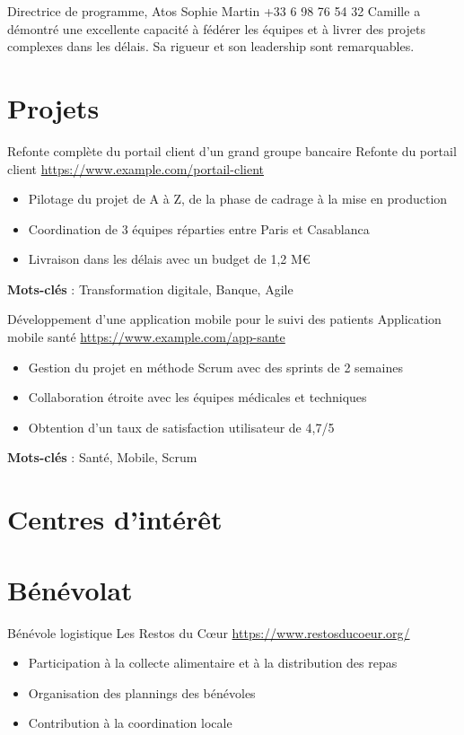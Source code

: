 \documentclass[a4paper, serif, 10pt]{moderncv}
\begin{document}
        {Directrice de programme, Atos}
        {Sophie Martin}
        {+33 6 98 76 54 32}
        {}
        {Camille a démontré une excellente capacité à fédérer les équipes et à livrer des projets complexes dans les délais. Sa rigueur et son leadership sont remarquables.}
\section{Projets}

        {Refonte complète du portail client d'un grand groupe bancaire}
        {Refonte du portail client}
        {\url{https://www.example.com/portail-client}}
        {}
        {\begin{itemize}
\item Pilotage du projet de A à Z, de la phase de cadrage à la mise en production
\item Coordination de 3 équipes réparties entre Paris et Casablanca
\item Livraison dans les délais avec un budget de 1,2 M€
\end{itemize}
\textbf{Mots-clés} : Transformation digitale, Banque, Agile}

        {Développement d'une application mobile pour le suivi des patients}
        {Application mobile santé}
        {\url{https://www.example.com/app-sante}}
        {}
        {\begin{itemize}
\item Gestion du projet en méthode Scrum avec des sprints de 2 semaines
\item Collaboration étroite avec les équipes médicales et techniques
\item Obtention d'un taux de satisfaction utilisateur de 4,7/5
\end{itemize}
\textbf{Mots-clés} : Santé, Mobile, Scrum}
\section{Centres d'intérêt}

\section{Bénévolat}

        {Bénévole logistique}
        {Les Restos du Cœur}
        {\url{https://www.restosducoeur.org/}}
        {}
        {\begin{itemize}
\item Participation à la collecte alimentaire et à la distribution des repas
\item Organisation des plannings des bénévoles
\item Contribution à la coordination locale
\end{itemize}}
    
\end{document}
